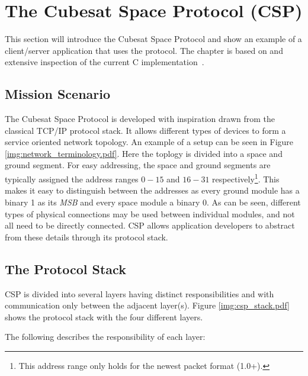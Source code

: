 \chapter{The Cubesat Space Protocol (CSP)}
\label{chapter:csp}
This section will introduce the Cubesat Space Protocol and show an example of a client/server application that uses the protocol. The chapter is based on \cite{GomSpace, GomSpace:CSP} and extensive inspection of the current C implementation~\cite{GomSpace:CSPsrcGit}.

\section{Mission Scenario}
The Cubesat Space Protocol is developed with inspiration drawn from the classical TCP/IP protocol stack. It allows different types of devices to form a service oriented network topology. An example of a setup can be seen in Figure \ref{img:network_terminology.pdf}. Here the toplogy is divided into a space and ground segment. For easy addressing, the space and ground segments are typically assigned the address ranges $0-15$ and $16-31$ respectively\footnote{This address range only holds for the newest packet format (1.0+).}. This makes it easy to distinguish between the addresses as every ground module has a binary 1 as its \textit{MSB} and every space module a binary 0. As can be seen, different types of physical connections may be used between individual modules, and not all need to be directly connected. CSP allows application developers to abstract from these details through its protocol stack.


\section{The Protocol Stack}
CSP is divided into several layers having distinct responsibilities and with communication only between the adjacent layer(s). Figure \ref{img:csp_stack.pdf} shows the protocol stack with the four different layers.


The following describes the responsibility of each layer:

